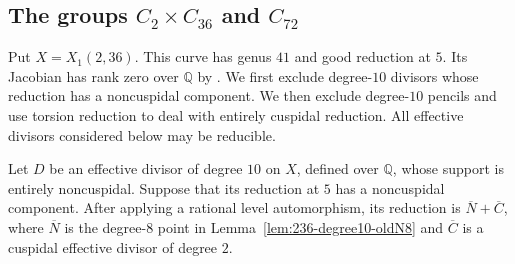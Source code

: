 \subsection{The groups $C_2\times C_{36}$ and $C_{72}$}
\label{subsec:decic236}

Put $X=X_1(2,36)$. This curve has genus $41$ and good reduction
at $5$. Its Jacobian has rank zero over $\mathbb Q$ by
\cite[Theorem~3.1(3)]{DEHMZ}.
We first exclude degree-$10$ divisors whose reduction has a
noncuspidal component. We then exclude degree-$10$ pencils and
use torsion reduction to deal with entirely cuspidal reduction.
All effective divisors considered below may be reducible.



\begin{lemma}\label{lem:decic236-finite-sieve}
Let $D$ be an effective divisor of degree $10$ on $X$, defined
over $\mathbb Q$, whose support is entirely noncuspidal.
Suppose that its reduction at $5$ has a noncuspidal component.
After applying a rational level automorphism, its reduction is
$\overline N+\overline C$, where $\overline N$ is the degree-$8$
point in Lemma~\ref{lem:236-degree10-oldN8} and $\overline C$
is a cuspidal effective divisor of degree $2$.
\end{lemma}
